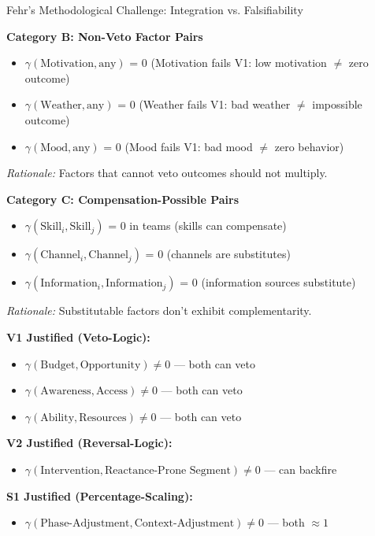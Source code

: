 \begin{chapter}{Fehr's Methodological Challenge: Integration vs. Falsifiability}
\begin{tcolorbox}[colback=blue!5!white,colframe=blue!75!black,title=\textbf{EBF Exclusion Commitments (Default $\gamma = 0$)}]
\textbf{Category B: Non-Veto Factor Pairs}
\begin{itemize}[noitemsep]
    \item $\gamma(\text{Motivation}, \text{any})$ = 0 (Motivation fails V1: low motivation $\neq$ zero outcome)
    \item $\gamma(\text{Weather}, \text{any})$ = 0 (Weather fails V1: bad weather $\neq$ impossible outcome)
    \item $\gamma(\text{Mood}, \text{any})$ = 0 (Mood fails V1: bad mood $\neq$ zero behavior)
\end{itemize}
\textit{Rationale:} Factors that cannot veto outcomes should not multiply.

\textbf{Category C: Compensation-Possible Pairs}
\begin{itemize}[noitemsep]
    \item $\gamma(\text{Skill}_i, \text{Skill}_j)$ = 0 in teams (skills can compensate)
    \item $\gamma(\text{Channel}_i, \text{Channel}_j)$ = 0 (channels are substitutes)
    \item $\gamma(\text{Information}_i, \text{Information}_j)$ = 0 (information sources substitute)
\end{itemize}
\textit{Rationale:} Substitutable factors don't exhibit complementarity.

\end{tcolorbox}

\begin{tcolorbox}[colback=green!5!white,colframe=green!75!black,title=\textbf{Permitted $\gamma \neq 0$ (Justified by EXC-5)}]

\textbf{V1 Justified (Veto-Logic):}
\begin{itemize}[noitemsep]
    \item $\gamma(\text{Budget}, \text{Opportunity}) \neq 0$ --- both can veto
    \item $\gamma(\text{Awareness}, \text{Access}) \neq 0$ --- both can veto
    \item $\gamma(\text{Ability}, \text{Resources}) \neq 0$ --- both can veto
\end{itemize}

\textbf{V2 Justified (Reversal-Logic):}
\begin{itemize}[noitemsep]
    \item $\gamma(\text{Intervention}, \text{Reactance-Prone Segment}) \neq 0$ --- can backfire
\end{itemize}

\textbf{S1 Justified (Percentage-Scaling):}
\begin{itemize}[noitemsep]
    \item $\gamma(\text{Phase-Adjustment}, \text{Context-Adjustment}) \neq 0$ --- both $\approx 1$
\end{itemize}


\end{tcolorbox}
\end{chapter}

